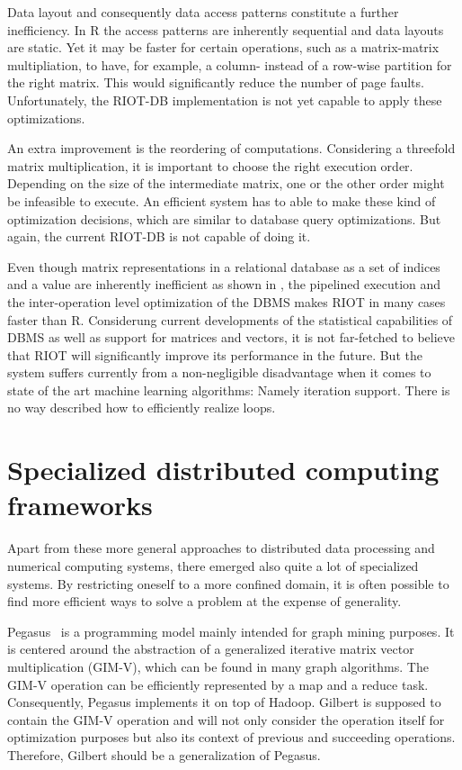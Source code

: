 Data layout and consequently data access patterns constitute a further inefficiency.
In R the access patterns are inherently sequential and data layouts are static.
Yet it may be faster for certain operations, such as a matrix-matrix multipliation, to have, for example, a column- instead of a row-wise partition for the right matrix.
This would significantly reduce the number of page faults.
Unfortunately, the RIOT-DB implementation is not yet capable to apply these optimizations.

An extra improvement is the reordering of computations.
Considering a threefold matrix multiplication, it is important to choose the right execution order.
Depending on the size of the intermediate matrix, one or the other order might be infeasible to execute.
An efficient system has to able to make these kind of optimization decisions, which are similar to database query optimizations.
But again, the current RIOT-DB is not capable of doing it.

Even though matrix representations in a relational database as a set of indices and a value are inherently inefficient as shown in \cite{stonebraker:2007a}, the pipelined execution and the inter-operation level optimization of the DBMS makes RIOT in many cases faster than R.
Considerung current developments of the statistical capabilities of DBMS as well as support for matrices and vectors, it is not far-fetched to believe that RIOT will significantly improve its performance in the future.
But the system suffers currently from a non-negligible disadvantage when it comes to state of the art machine learning algorithms: Namely iteration support.
There is no way described how to efficiently realize loops.

\section{Specialized distributed computing frameworks}

Apart from these more general approaches to distributed data processing and numerical computing systems, there emerged also quite a lot of specialized systems.
By restricting oneself to a more confined domain, it is often possible to find more efficient ways to solve a problem at the expense of generality.

Pegasus~\cite{kang:2009a} is a programming model mainly intended for graph mining purposes.
It is centered around the abstraction of a generalized iterative matrix vector multiplication (GIM-V), which can be found in many graph algorithms.
The GIM-V operation can be efficiently represented by a map and a reduce task.
Consequently, Pegasus implements it on top of Hadoop.
Gilbert is supposed to contain the GIM-V operation and will not only consider the operation itself for optimization purposes but also its context of previous and succeeding operations.
Therefore, Gilbert should be a generalization of Pegasus.

